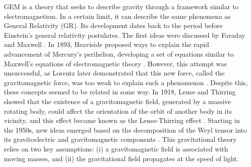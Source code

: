 \documentclass[11pt,showpacs,preprintnumbers,amsmath,amssymb,prd,nofootinbib,superscriptaddress]{revtex4-2}
\begin{document}
GEM is a theory that seeks to describe gravity through a framework similar to electromagnetism. In a certain limit, it can describe the same phenomena as General Relativity (GR). Its development dates back to the period before Einstein's general relativity postulates. The first ideas were discussed by Faraday \cite{Faraday} and Maxwell \cite{Maxwell}. In 1893, Heaviside proposed ways to explain the rapid advancement of Mercury's perihelion, developing a set of equations similar to Maxwell's equations of electromagnetic theory \cite{heaviside1893gravitational}. However, this attempt was unsuccessful, as Lorentz later demonstrated that this new force, called the gravitomagnetic force, was too weak to explain such a phenomenon \cite{lorentz1899considerations}. Despite this, these concepts seemed to be related in some way. In 1918, Lense and Thirring showed that the existence of a gravitomagnetic field, generated by a massive rotating body, could affect the orientation of the orbit of another body in its vicinity, and this effect became known as the Lense-Thirring effect \cite{LT}. Starting in the 1950s, new ideas emerged based on the decomposition of the Weyl tensor into its gravitoelectric and gravitomagnetic components \cite{matte1953nouvelles, bel1958radiation}. This gravitational theory relies on two key assumptions: (i) a gravitomagnetic field is associated with moving masses, and (ii) the gravitational field propagates at the speed of light. 
\end{document}
